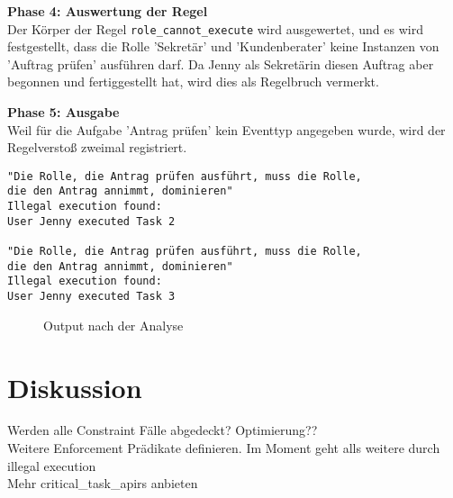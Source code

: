 \textbf{Phase 4: Auswertung der Regel}\\
Der Körper der Regel \texttt{role\_cannot\_execute} wird ausgewertet, und es wird festgestellt, dass die Rolle 'Sekretär' und 'Kundenberater' keine Instanzen von 'Auftrag prüfen' ausführen darf. Da Jenny als Sekretärin diesen Auftrag aber begonnen und fertiggestellt hat, wird dies als Regelbruch vermerkt.

\textbf{Phase 5: Ausgabe}\\
Weil für die Aufgabe 'Antrag prüfen' kein Eventtyp angegeben wurde, wird der Regelverstoß zweimal registriert.

\begin{verbatim}
"Die Rolle, die Antrag prüfen ausführt, muss die Rolle,
die den Antrag annimmt, dominieren"
Illegal execution found:
User Jenny executed Task 2

"Die Rolle, die Antrag prüfen ausführt, muss die Rolle,
die den Antrag annimmt, dominieren"
Illegal execution found:
User Jenny executed Task 3
\end{verbatim}
\begin{figure}[h!]
\caption{Output nach der Analyse}
\end{figure}

\section{Diskussion}

Werden alle Constraint Fälle abgedeckt?
Optimierung??\\
Weitere Enforcement Prädikate definieren. Im Moment geht alls weitere durch illegal execution\\
Mehr critical\_task\_apirs anbieten\\



